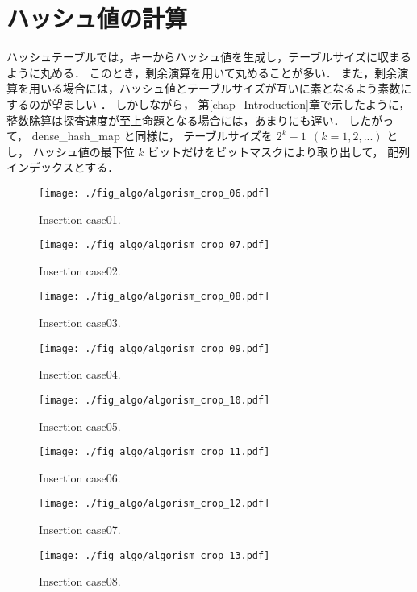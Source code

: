 \section{ハッシュ値の計算}

ハッシュテーブルでは，キーからハッシュ値を生成し，テーブルサイズに収まるように丸める．
このとき，剰余演算を用いて丸めることが多い．
また，剰余演算を用いる場合には，ハッシュ値とテーブルサイズが互いに素となるよう素数にするのが望ましい \citep{石畑1989}．
しかしながら，
第\ref{chap_Introduction}章で示したように，
整数除算は探査速度が至上命題となる場合には，あまりにも遅い．
したがって，
dense\_hash\_map と同様に，
テーブルサイズを $2^k-1\ \ (k=1,2,...)$ とし，
ハッシュ値の最下位 $k$ ビットだけをビットマスクにより取り出して，
配列インデックスとする．


\begin{figure}[h]
  \texttt{[image: ./fig\_algo/algorism\_crop\_06.pdf]}
  \caption{ Insertion case01. }
  \label{fig_IpCHashT_insert_hard_case01}

  \texttt{[image: ./fig\_algo/algorism\_crop\_07.pdf]}
  \caption{ Insertion case02. }
  \label{fig_IpCHashT_insert_hard_case02}

  \texttt{[image: ./fig\_algo/algorism\_crop\_08.pdf]}
  \caption{ Insertion case03. }
  \label{fig_IpCHashT_insert_hard_case03}

  \texttt{[image: ./fig\_algo/algorism\_crop\_09.pdf]}
  \caption{ Insertion case04. }
  \label{fig_IpCHashT_insert_hard_case04}
\end{figure}

\begin{figure}[h]
  \texttt{[image: ./fig\_algo/algorism\_crop\_10.pdf]}
  \caption{ Insertion case05. }
  \label{fig_IpCHashT_insert_hard_case05}

  \texttt{[image: ./fig\_algo/algorism\_crop\_11.pdf]}
  \caption{ Insertion case06. }
  \label{fig_IpCHashT_insert_hard_case06}

  \texttt{[image: ./fig\_algo/algorism\_crop\_12.pdf]}
  \caption{ Insertion case07. }
  \label{fig_IpCHashT_insert_hard_case07}

  \texttt{[image: ./fig\_algo/algorism\_crop\_13.pdf]}
  \caption{ Insertion case08. }
  \label{fig_IpCHashT_insert_hard_case08}
\end{figure}

